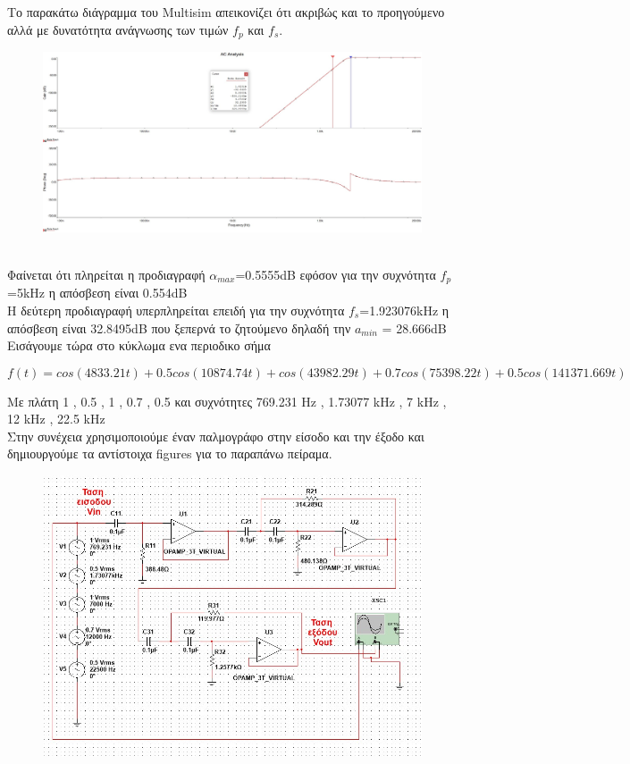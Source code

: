 \documentclass{article}
\begin{document}
{{{Tο παρακάτω διάγραμμα του Multisim απεικονίζει ότι ακριβώς και το προηγούμενο αλλά με δυνατότητα ανάγνωσης των τιμών $f_p$ και $f_s$.
\begin{figure}[h!]
\centering
 	\advance\leftskip-2.3cm
  \includegraphics[width=150mm,scale=2]{thema4/multisim1a.jpg}
\end{figure}  \\
Φαίνεται ότι πληρείται η προδιαγραφή $α_{max}$=0.5555dB εφόσον για την συχνότητα $f_p$=5kHz η απόσβεση είναι 0.554dB \\ Η δεύτερη προδιαγραφή υπερπληρείται επειδή για την συχνότητα $f_s$=1.923076kHz η απόσβεση είναι 32.8495dB  που ξεπερνά το ζητούμενο δηλαδή την $a_{min}$ = 28.666dB
\clearpage
Εισάγουμε τώρα στο κύκλωμα ενα περιοδικο σήμα\begin{changemargin}{-2.5cm}{0.5cm}\begin{equation*}
\boxed{
f(t) = cos(4833.21t) + 0.5 cos(10874.74t) + cos(43982.29t) + 0.7cos(75398.22t) + 0.5cos(141371.669t) }
\end{equation*}
\end{changemargin}
Με πλάτη 1 , 0.5 , 1 , 0.7 , 0.5 και συχνότητες  769.231 Hz , 1.73077 kHz , 7 kHz , 12 kHz , 22.5 kHz \\
Στην συνέχεια χρησιμοποιούμε έναν παλμογράφο στην είσοδο και την έξοδο και δημιουργούμε τα αντίστοιχα figures για το παραπάνω πείραμα.
\begin{figure}[h!]
\centering
 	\advance\leftskip-3cm
  \includegraphics[width=175mm,scale=2]{thema4/eisagogi.jpg}

\end{figure}}}}
\end{document}
